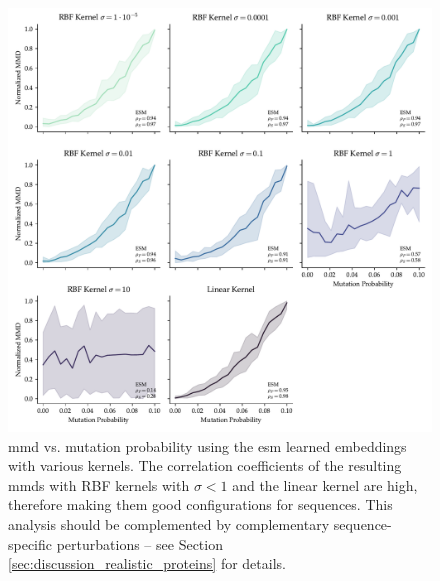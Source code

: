 
\begin{figure}
  \centering
  \includegraphics[width=\textwidth]{./figures/results/res_5.pdf}
  \caption[\gls{mmd} using \acrshort{esm} embeddings.]{\gls{mmd} vs. mutation probability using the \acrshort{esm}
learned embeddings with various kernels. The correlation coefficients of the
resulting \gls{mmd}s with RBF kernels with $\sigma<1$ and the linear kernel are high,
therefore making them good configurations for sequences. This analysis should be
complemented by complementary sequence-specific perturbations -- see Section
\ref{sec:discussion_realistic_proteins} for details.}
  \label{fig:esm_descriptor}
\end{figure}

